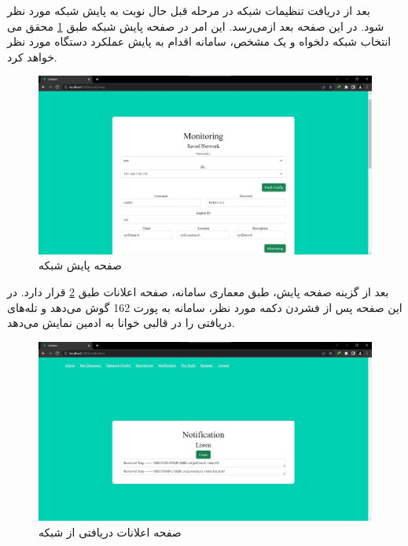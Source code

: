 بعد از دریافت تنظیمات شبکه در مرحله قبل حال نوبت به پایش شبکه مورد نظر می‌رسد. این امر در صفحه پایش شبکه طبق \cref{fig.18} محقق می‌‎شود. در این صفحه بعد از انتخاب شبکه دلخواه و یک  مشخص، سامانه اقدام به پایش عملکرد دستگاه مورد نظر خواهد کرد.


\begin{figure}[!h]
    \centering\includegraphics[scale=.38]{./monitoring}
    \caption{صفحه پایش شبکه}\label{fig.18}
\end{figure}



بعد از گزینه صفحه پایش، طبق معماری سامانه، صفحه اعلانات طبق \cref{fig.19} قرار دارد. در این صفحه پس از فشردن دکمه مورد نظر، سامانه به پورت 162 گوش می‌دهد و تله‌های دریافتی را در قالبی خوانا به ادمین نمایش می‌دهد.

\begin{figure}[!h]
    \centering\includegraphics[scale=.38]{./notification}
    \caption{صفحه اعلانات دریافتی از شبکه}\label{fig.19}
\end{figure}

